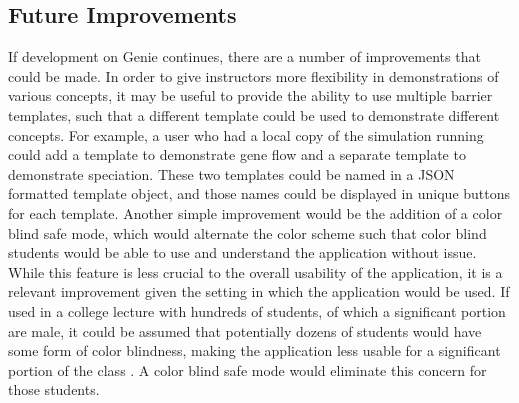 \documentclass[12pt]{article}
\begin{document}
\begin{spacing}{1.6}
\subsection{Future Improvements}
If development on Genie continues, there are a number of improvements that could be made. In order to give instructors more flexibility in demonstrations of various concepts, it may be useful to provide the ability to use multiple barrier templates, such that a different template could be used to demonstrate different concepts. For example, a user who had a local copy of the simulation running could add a template to demonstrate gene flow and a separate template to demonstrate speciation. These two templates could be named in a JSON formatted template object, and those names could be displayed in unique buttons for each template.\newline
\newline
Another simple improvement would be the addition of a color blind safe mode, which would alternate the color scheme such that color blind students would be able to use and understand the application without issue. While this feature is less crucial to the overall usability of the application, it is a relevant improvement given the setting in which the application would be used. If used in a college lecture with hundreds of students, of which a significant portion are male, it could be assumed that potentially dozens of students would have some form of color blindness, making the application less usable for a significant portion of the class \cite{colorblind}. A color blind safe mode would eliminate this concern for those students.


\end{spacing}
\end{document}
